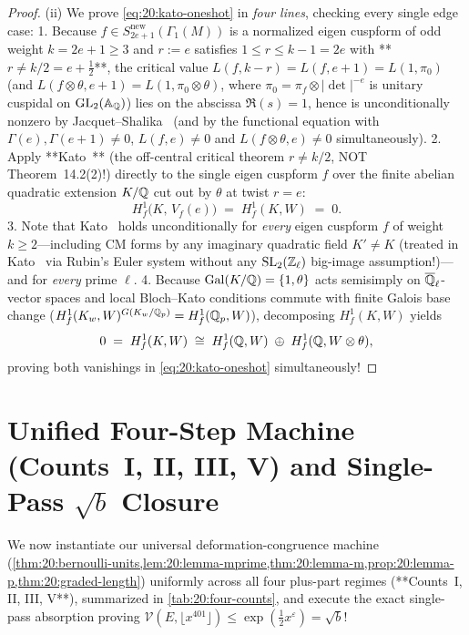 \begin{proof}
(ii) We prove \eqref{eq:20:kato-oneshot} in \emph{four lines}, checking every single edge case:
1. Because $f \in S_{2e+1}^{\mathrm{new}}(\Gamma_1(M))$ is a normalized eigen cuspform of odd weight $k = 2e + 1 \ge 3$ and $r := e$ satisfies $1 \le r \le k - 1 = 2e$ with **$r \neq k/2 = e + \frac{1}{2}$**, the critical value $L(f, k - r) = L(f, e + 1) = L(1, \pi_0)$ (and $L(f \otimes \theta, e + 1) = L(1, \pi_0 \otimes \theta)$, where $\pi_0 = \pi_f \otimes |\det|^{-e}$ is unitary cuspidal on $\mathrm{GL}_2(\mathbb{A}_{\mathbb{Q}})$) lies on the abscissa $\Re(s) = 1$, hence is unconditionally nonzero by Jacquet--Shalika~\cite[Theorem~1]{JacquetShalika1976} (and by the functional equation with $\Gamma(e), \Gamma(e+1) \neq 0$, $L(f, e) \neq 0$ and $L(f \otimes \theta, e) \neq 0$ simultaneously).
2. Apply **Kato~\cite[Theorem~14.2(1)]{Kato2004}** (the off-central critical theorem $r \neq k/2$, NOT Theorem~14.2(2)!) directly to the single eigen cuspform $f$ over the finite abelian quadratic extension $K/\mathbb{Q}$ cut out by $\theta$ at twist $r = e$:
\[
  H^1_f\bigl(K,\, V_f(e)\bigr) \;=\; H^1_f(K, W) \;=\; 0.
\]
3. Note that Kato~\cite[Theorem~14.2(1)]{Kato2004} holds unconditionally for \emph{every} eigen cuspform $f$ of weight $k \ge 2$—including CM forms by any imaginary quadratic field $K' \neq K$ (treated in Kato~\cite[\S15]{Kato2004} via Rubin's Euler system without any $\mathrm{SL}_2(\mathbb{Z}_\ell)$ big-image assumption!)—and for \emph{every} prime $\ell$.
4. Because $\mathrm{Gal}(K/\mathbb{Q}) = \{1, \theta\}$ acts semisimply on $\overline{\mathbb{Q}}_\ell$-vector spaces and local Bloch--Kato conditions commute with finite Galois base change ($H^1_f(K_w, W)^{G(K_w/\mathbb{Q}_p)} = H^1_f(\mathbb{Q}_p, W)$), decomposing $H^1_f(K, W)$ yields
\[
  0 \;=\; H^1_f(K, W) \;\cong\; H^1_f(\mathbb{Q}, W) \;\oplus\; H^1_f(\mathbb{Q}, W \otimes \theta),
\]
proving both vanishings in \eqref{eq:20:kato-oneshot} simultaneously!
\end{proof}

\section{Unified Four-Step Machine (Counts~I, II, III, V) and Single-Pass $\sqrt{b}$ Closure}
\label{sec:20:vwin-closure}

We now instantiate our universal deformation-congruence machine (\cref{thm:20:bernoulli-units,lem:20:lemma-mprime,thm:20:lemma-m,prop:20:lemma-p,thm:20:graded-length}) uniformly across all four plus-part regimes (**Counts~I, II, III, V**), summarized in \cref{tab:20:four-counts}, and execute the exact single-pass absorption proving $\mathcal{V}(E, \lfloor x^{401}\rfloor) \le \exp(\frac{1}{2}x^\varepsilon) = \sqrt{b}$!

